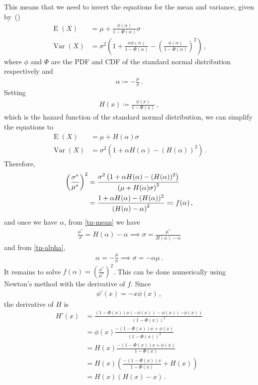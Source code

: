 \documentclass{article}
\DeclareMathOperator{\E}{E}
\DeclareMathOperator{\Var}{Var}
\begin{document}
%
This means that we need to invert the equations for the mean and variance,
given by~(\cite{johnson})
%
\begin{align*}
	\E(X) &= \mu + \frac{\phi(\alpha)}{1 - \Phi(\alpha)} \sigma \\
	\Var(X) &= \sigma ^ 2
		\left(1 + \frac{\alpha \phi(\alpha)}{1 - \Phi(\alpha)}
		- \left(\frac{\phi(\alpha)}{1 - \Phi(\alpha)}\right) ^ 2\right) \,,
\end{align*}
%
where $\phi$ and $\Phi$ are the PDF and CDF of the
standard normal distribution respectively and
%
\begin{align}
	\alpha \coloneqq -\frac{\mu}{\sigma} \,.
	\label{tn-alpha}
\end{align}
%
Setting
%
\begin{align*}
	H(x) \coloneqq \frac{\phi(x)}{1 - \Phi(x)} \,,
\end{align*}
%
which is the hazard function of the standard normal distribution, we can
simplify the equations to
%
\begin{align}
	\E(X) &= \mu + H(\alpha)\sigma \label{tn-mean} \\
	\Var(X) &= \sigma ^ 2 \left(1 + \alpha H(\alpha)
		- (H(\alpha)) ^ 2 \right)
		\label{tn-var} \,.
\end{align}
%
Therefore,
%
\begin{align*}
	\left(\frac{\sigma^*}{\mu^*}\right)^2 &=
		\frac{\sigma ^ 2 \left(1 + \alpha H(\alpha)
		- (H(\alpha)) ^ 2 \right)}{%
		\left(\mu + H(\alpha) \sigma\right) ^ 2} \\
	&= \frac{1 + \alpha H(\alpha) - (H(\alpha)) ^ 2}
		{\left(H(\alpha) - \alpha\right) ^ 2} \eqqcolon f(\alpha) \,, \\
\end{align*}
%
and once we have $\alpha$, from \eqref{tn-mean} we have
%
\begin{align*}
	\frac{\mu^*}{\sigma} = H(\alpha) - \alpha
		\implies \sigma = \frac{\mu^*}{H(\alpha) - \alpha}
\end{align*}
%
and from \eqref{tn-alpha},
%
\begin{align*}
	\alpha = -\frac{\mu}{\sigma} \implies \sigma =  -\alpha \mu \,.
\end{align*}
%
It remains to solve $f(\alpha) = \left(\frac{\sigma^*}{\mu^*}\right) ^ 2$.
This can be done numerically using
Newton's method with the derivative of $f$.
Since
%
\begin{align*}
	\phi'(x) = -x \phi(x) \,,
\end{align*}
%
the derivative of $H$ is
%
\begin{align*}
	H'(x) &= \frac{(1 - \Phi(x)) x (-\phi(x))
		- \phi(x)(- \phi(x))}{(1 - \Phi(x))^2} \\
	&= \phi(x) \frac{-(1 - \Phi(x)) x + \phi(x)}
		{(1 - \Phi(x))^2} \\
	&= H(x) \frac{-(1 - \Phi(x)) x + \phi(x)}
		{1 - \Phi(x)} \\
	&= H(x) \left(\frac{-(1 - \Phi(x)) x}
		{1 - \Phi(x)} + H(x) \right) \\
	&= H(x) \left(H(x) - x \right) \,.
\end{align*}
\end{document}
